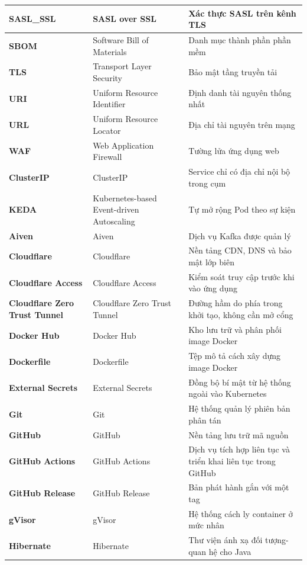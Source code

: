 \documentclass[../BTL.tex]{subfiles}
\begin{document}
\begin{longtable}{|p{3.2cm}|p{3.5cm}|p{7.1cm}|}
	\textbf{SASL\_SSL} & SASL over SSL & Xác thực SASL trên kênh TLS\\ \hline
	\textbf{SBOM} & Software Bill of Materials & Danh mục thành phần phần mềm\\ \hline
	\textbf{TLS} & Transport Layer Security & Bảo mật tầng truyền tải\\ \hline
	\textbf{URI} & Uniform Resource Identifier & Định danh tài nguyên thống nhất\\ \hline
	\textbf{URL} & Uniform Resource Locator & Địa chỉ tài nguyên trên mạng\\ \hline
	\textbf{WAF} & Web Application Firewall & Tường lửa ứng dụng web\\ \hline
	\textbf{ClusterIP} & ClusterIP & Service chỉ có địa chỉ nội bộ trong cụm\\ \hline
	\textbf{KEDA} & Kubernetes-based Event-driven Autoscaling & Tự mở rộng Pod theo sự kiện\\ \hline
	\textbf{Aiven} & Aiven & Dịch vụ Kafka được quản lý\\ \hline
	\textbf{Cloudflare} & Cloudflare & Nền tảng CDN, DNS và bảo mật lớp biên\\ \hline
	\textbf{Cloudflare Access} & Cloudflare Access & Kiểm soát truy cập trước khi vào ứng dụng\\ \hline
	\textbf{Cloudflare Zero Trust Tunnel} & Cloudflare Zero Trust Tunnel & Đường hầm do phía trong khởi tạo, không cần mở cổng\\ \hline
	\textbf{Docker Hub} & Docker Hub & Kho lưu trữ và phân phối image Docker\\ \hline
	\textbf{Dockerfile} & Dockerfile & Tệp mô tả cách xây dựng image Docker\\ \hline
	\textbf{External Secrets} & External Secrets & Đồng bộ bí mật từ hệ thống ngoài vào Kubernetes\\ \hline
	\textbf{Git} & Git & Hệ thống quản lý phiên bản phân tán\\ \hline
	\textbf{GitHub} & GitHub & Nền tảng lưu trữ mã nguồn\\ \hline
	\textbf{GitHub Actions} & GitHub Actions & Dịch vụ tích hợp liên tục và triển khai liên tục trong GitHub\\ \hline
	\textbf{GitHub Release} & GitHub Release & Bản phát hành gắn với một tag\\ \hline
	\textbf{gVisor} & gVisor & Hệ thống cách ly container ở mức nhân\\ \hline
	\textbf{Hibernate} & Hibernate & Thư viện ánh xạ đối tượng-quan hệ cho Java\\ \hline

\end{longtable}
\end{document}
